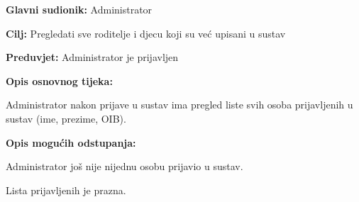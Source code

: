 						\noindent {}
					\begin{packed_item}
						
						\item \textbf{Glavni sudionik: }Administrator
						\item  \textbf{Cilj:} Pregledati sve roditelje i djecu koji su već upisani u sustav
						\item  \textbf{Preduvjet:} Administrator je prijavljen
						\item  \textbf{Opis osnovnog tijeka:}
						
						\item[] \begin{packed_enum}
							
							\item Administrator nakon prijave u sustav ima pregled liste svih osoba prijavljenih u sustav (ime, prezime, OIB).
						\end{packed_enum}
						
						\item  \textbf{Opis mogućih odstupanja:}
						
						\item[] \begin{packed_item}
							
							\item[4.a] Administrator još nije nijednu osobu prijavio u sustav.
							\item[] \begin{packed_enum}
								
								\item Lista prijavljenih je prazna.
							\end{packed_enum}
							
							
						\end{packed_item}
						
						
					\end{packed_item}
					
